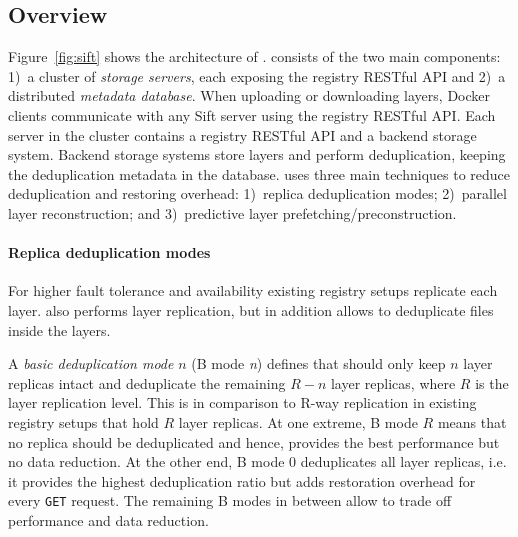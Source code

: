 \subsection{Overview}
\label{sec:overview}



Figure~\ref{fig:sift} shows the architecture of \sysname.
%
\sysname consists of the two main components: %
1)~a cluster of \emph{storage servers}, each
exposing the registry RESTful API and 2)~a distributed
\emph{metadata database}. 
%
When uploading or downloading layers, 
Docker clients communicate with any Sift
server using the registry RESTful API.
%
%
Each server in the cluster contains a registry RESTful API and a backend storage system.
%
Backend storage systems store
layers and perform deduplication, keeping the deduplication metadata in the
database.
%
%
%
\sysname uses three main techniques to reduce deduplication and restoring overhead:
1)~replica deduplication modes; 2)~parallel layer reconstruction; and
3)~predictive layer prefetching/preconstruction.




\paragraph{Replica deduplication modes}
%
For higher fault tolerance and availability existing registry setups replicate each layer.
%
\sysname also performs layer replication, but in addition allows to deduplicate
files inside the layers.

A \emph{basic deduplication mode} $n$ (B mode \emph{n}) defines that \sysname should only
keep $n$ layer replicas intact and deduplicate the remaining $R-n$ layer
replicas, where $R$ is the layer replication level. This is in comparison to R-way replication in existing registry setups that hold $R$ layer replicas.
%
At one extreme, B mode $R$ means that no replica should be deduplicated and
hence, provides the best performance but no data reduction.
%
At the other end, B mode $0$ deduplicates all layer replicas, i.e. it provides
the highest deduplication ratio but adds restoration overhead for every
\texttt{GET} request.
%
The remaining B modes in between allow to trade off performance and data
reduction.


